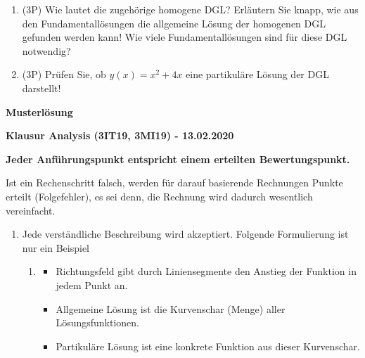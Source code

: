 \documentclass[12pt]{article}
\begin{document}
{\begin{enumerate}[label=(\alph*)]
\bigskip
\bigskip
\bigskip
\bigskip
\bigskip

\item (3P) Wie lautet die zugehörige homogene DGL? Erläutern Sie knapp, wie aus den Fundamentallösungen die allgemeine Lösung der homogenen DGL gefunden werden kann! Wie viele Fundamentallösungen sind für diese DGL notwendig?

\bigskip
\bigskip
\bigskip
\bigskip
\bigskip
\bigskip
\bigskip
\bigskip
\bigskip
\bigskip
\bigskip

\item (3P) Prüfen Sie, ob $y(x) = x^2+4x$ eine partikuläre Lösung der DGL darstellt!


\end{enumerate}

\label{LastTask}

\newpage

\begin{center}
{\bf {\large Musterlösung}}
\end{center}

\begin{center}
{\bf {\large Klausur Analysis (3IT19, 3MI19) - 13.02.2020}}
\end{center}

\begin{center}
\textbf{Jeder Anführungspunkt entspricht einem erteilten Bewertungspunkt.} 

Ist ein Rechenschritt falsch, werden für darauf basierende Rechnungen Punkte erteilt (Folgefehler), es sei denn, die Rechnung wird dadurch wesentlich vereinfacht. 
\end{center}

\begin{enumerate}

\item Jede verständliche Beschreibung wird akzeptiert. Folgende Formulierung ist nur ein Beispiel
\begin{enumerate}


\item
\begin{itemize}
\item Richtungsfeld gibt durch Liniensegmente den Anstieg der Funktion in jedem Punkt an.
\item Allgemeine Lösung ist die Kurvenschar (Menge) aller Lösungsfunktionen.
\item Partikuläre Lösung ist eine konkrete Funktion aus dieser Kurvenschar.
\end{itemize}


\end{enumerate}
\end{enumerate}}
\end{document}
